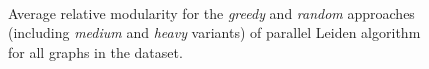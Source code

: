 \begin{figure}[hbtp]
  \centering
   \\[-2ex]
  \caption{Average relative modularity for the \textit{greedy} and \textit{random} approaches (including \textit{medium} and \textit{heavy} variants) of parallel Leiden algorithm for all graphs in the dataset.}
  \label{fig:leidenopt-modularity}
\end{figure}
